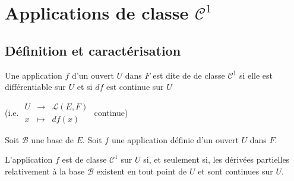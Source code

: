 \documentclass[a4paper,12pt]{book}
\newcommand{\Def}[2]{\begin{tcolorbox}[sharp corners, colback=white,colframe=blue!90!black!75, title=Définition : #1]#2\end{tcolorbox}}
\newcommand{\Thr}[2]{\begin{tcolorbox}[sharp corners, colback=white,colframe=red!90!black!75, title=Théorème : #1]#2\end{tcolorbox}}
\begin{document}
\section{Applications de classe $\mathcal{C}^1$}
\subsection{Définition et caractérisation}
\Def{}{Une application $f$ d'un ouvert $U$ dans $F$ est dite de de classe $\mathcal{C}^1$ si elle est différentiable sur $U$ et si $df$ est continue sur $U$
\par (i.e. $\begin{array}{rcl} U & \to & \mathcal{L}(E,F) \\ x & \mapsto & df(x)\end{array}$ continue)}
\Thr{}{Soit $\mathcal{B}$ une base de $E$. Soit $f$ une application définie d'un ouvert $U$ dans $F$.
\par L'application $f$ est de classe $\mathcal{C}^1$ sur $U$ si, et seulement si, les dérivées partielles relativement à la base $\mathcal{B}$ existent en tout point de $U$ et sont continues sur $U$.}
\end{document}
